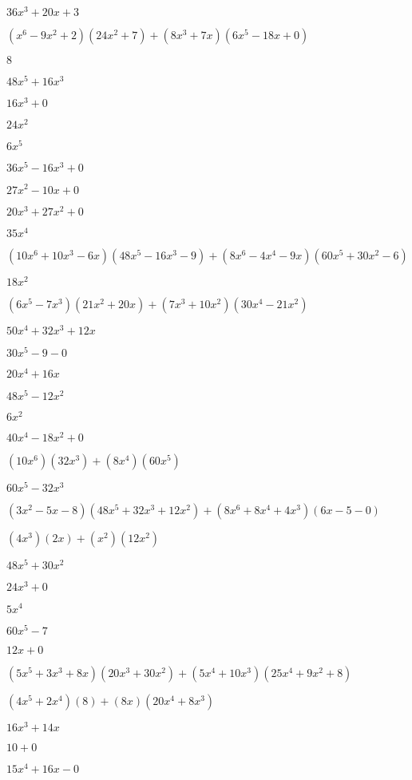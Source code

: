 \documentclass{article}
\begin{document}
\begin{multicols}{2}
$36x^{3}+20x+3$\item $(x^{6}-9x^2+2)(24x^{2}+7)+(8x^{3}+7x)(6x^{5}-18x+0)$\item $8$\item $48x^{5}+16x^{3}$\item $16x^{3}+0$\item $24x^{2}$\item $6x^{5}$\item $36x^{5}-16x^{3}+0$\item $27x^{2}-10x+0$\item $20x^{3}+27x^{2}+0$\item $35x^{4}$\item $(10x^{6}+10x^{3}-6x)(48x^{5}-16x^{3}-9)+(8x^{6}-4x^{4}-9x)(60x^{5}+30x^{2}-6)$\item $18x^{2}$\item $(6x^{5}-7x^{3})(21x^{2}+20x)+(7x^{3}+10x^2)(30x^{4}-21x^{2})$\item $50x^{4}+32x^{3}+12x$\item $30x^{5}-9-0$\item $20x^{4}+16x$\item $48x^{5}-12x^{2}$\item $6x^{2}$\item $40x^{4}-18x^{2}+0$\item $(10x^{6})(32x^{3})+(8x^{4})(60x^{5})$\item $60x^{5}-32x^{3}$\item $(3x^2-5x-8)(48x^{5}+32x^{3}+12x^{2})+(8x^{6}+8x^{4}+4x^{3})(6x-5-0)$\item $(4x^{3})(2x)+(x^2)(12x^{2})$\item $48x^{5}+30x^{2}$\item $24x^{3}+0$\item $5x^{4}$\item $60x^{5}-7$\item $12x+0$\item $(5x^{5}+3x^{3}+8x)(20x^{3}+30x^{2})+(5x^{4}+10x^{3})(25x^{4}+9x^{2}+8)$\item $(4x^{5}+2x^{4})(8)+(8x)(20x^{4}+8x^{3})$\item $16x^{3}+14x$\item $10+0$\item $15x^{4}+16x-0$\item 
\end{multicols}
\end{document}
